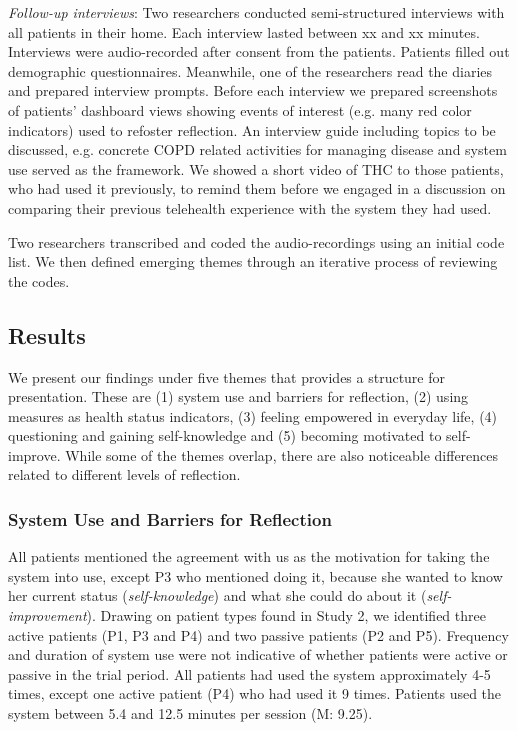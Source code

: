 \textit{Follow-up interviews}: Two researchers conducted semi-structured interviews with all patients in their home. Each interview lasted between xx and xx minutes. Interviews were audio-recorded after consent from the patients. Patients filled out demographic questionnaires. Meanwhile, one of the researchers read the diaries and prepared interview prompts. Before each interview we prepared screenshots of patients’ dashboard views showing events of interest (e.g. many red color indicators) used to refoster reflection. An interview guide including topics to be discussed, e.g. concrete COPD related activities for managing disease and system use served as the framework. We showed a short video of THC to those patients, who had used it previously, to remind them before we engaged in a discussion on comparing their previous telehealth experience with the system they had used. 

Two researchers transcribed and coded the audio-recordings using an initial code list. We then defined emerging themes through an iterative process of reviewing the codes. 

\subsection{Results}
We present our findings under five themes that provides a structure for presentation. These are (1) system use and barriers for reflection, (2) using measures as health status indicators, (3) feeling empowered in everyday life, (4) questioning and gaining self-knowledge and (5) becoming motivated to self-improve. While some of the themes overlap, there are also noticeable differences related to different levels of reflection. 

\subsubsection{System Use and Barriers for Reflection}
All patients mentioned the agreement with us as the motivation for taking the system into use, except P3 who mentioned doing it, because she wanted to know her current status (\textit{self-knowledge}) and what she could do about it (\textit{self-improvement}). Drawing on patient types found in Study 2, we identified three active patients (P1, P3 and P4) and two passive patients (P2 and P5). Frequency and duration of system use were not indicative of whether patients were active or passive in the trial period. All patients had used the system approximately 4-5 times, except one active patient (P4) who had used it 9 times. Patients used the system between 5.4 and 12.5 minutes per session (M: 9.25). 
 
